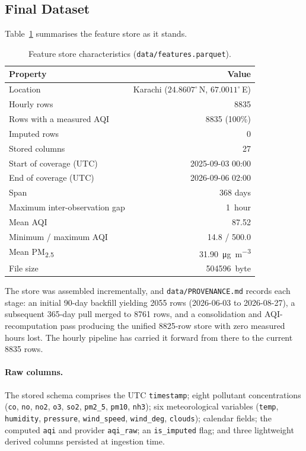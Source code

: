 \documentclass[11pt,a4paper]{article}
\newcommand{\pmfine}{PM\textsubscript{2.5}\xspace}
\begin{document}
\subsection{Final Dataset}

Table~\ref{tab:dataset} summarises the feature store as it stands.

\begin{table}[H]
\centering
\caption{Feature store characteristics (\texttt{data/features.parquet}).}
\label{tab:dataset}
\small
\begin{tabular}{@{}lr@{}}
\toprule
\textbf{Property} & \textbf{Value}\\
\midrule
Location & Karachi ($24.8607^\circ$\,N, $67.0011^\circ$\,E)\\
Hourly rows & \num{8835}\\
Rows with a measured AQI & \num{8835} (100\%)\\
Imputed rows & 0\\
Stored columns & 27\\
Start of coverage (UTC) & 2025-09-03 00:00\\
End of coverage (UTC) & 2026-09-06 02:00\\
Span & 368 days\\
Maximum inter-observation gap & \SI{1}{hour}\\
Mean AQI & 87.52\\
Minimum / maximum AQI & 14.8 / 500.0\\
Mean \pmfine & \SI{31.90}{\micro\gram\per\cubic\metre}\\
File size & \SI{504596}{byte}\\
\bottomrule
\end{tabular}
\end{table}

The store was assembled incrementally, and \texttt{data/PROVENANCE.md} records
each stage: an initial 90-day backfill yielding \num{2055} rows
(2026-06-03 to 2026-08-27), a subsequent 365-day pull merged to \num{8761}
rows, and a consolidation and AQI-recomputation pass producing the unified
\num{8825}-row store with zero measured hours lost. The hourly pipeline has
carried it forward from there to the current \num{8835} rows.

\paragraph{Raw columns.} The stored schema comprises the UTC
\texttt{timestamp}; eight pollutant concentrations (\texttt{co}, \texttt{no},
\texttt{no2}, \texttt{o3}, \texttt{so2}, \texttt{pm2\_5}, \texttt{pm10},
\texttt{nh3}); six meteorological variables (\texttt{temp}, \texttt{humidity},
\texttt{pressure}, \texttt{wind\_speed}, \texttt{wind\_deg}, \texttt{clouds});
calendar fields; the computed \texttt{aqi} and provider \texttt{aqi\_raw}; an
\texttt{is\_imputed} flag; and three lightweight derived columns persisted at
ingestion time.
\end{document}
